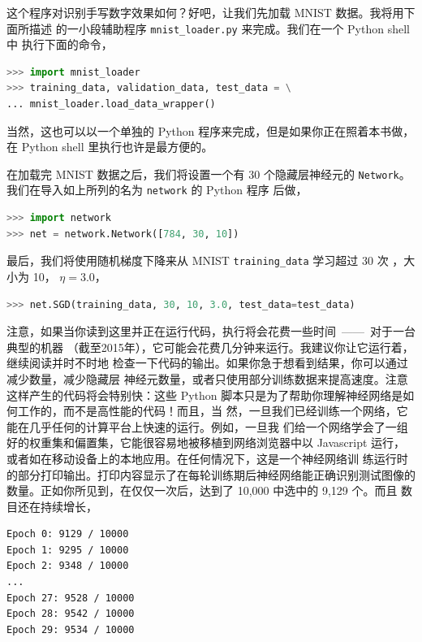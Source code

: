 

这个程序对识别手写数字效果如何？好吧，让我们先加载 MNIST 数据。我将用下面所描述
的一小段辅助程序 \lstinline!mnist_loader.py! 来完成。我们在一个 Python shell 中
执行下面的命令，

\begin{lstlisting}[language=Python]
>>> import mnist_loader
>>> training_data, validation_data, test_data = \
... mnist_loader.load_data_wrapper()
\end{lstlisting}

当然，这也可以以一个单独的 Python 程序来完成，但是如果你正在照着本书做，在
Python shell 里执行也许是最方便的。

在加载完 MNIST 数据之后，我们将设置一个有 30 个隐藏层神经元的
\lstinline!Network!。我们在导入如上所列的名为 \lstinline!network! 的 Python 程序
后做，

\begin{lstlisting}[language=Python]
>>> import network
>>> net = network.Network([784, 30, 10])
\end{lstlisting}

最后，我们将使用随机梯度下降来从 MNIST \lstinline!training_data! 学习超过 30 次%
\epochs{}，\minibatch{}大小为 10，\learningrate{} $\eta = 3.0$，

\begin{lstlisting}[language=Python]
>>> net.SGD(training_data, 30, 10, 3.0, test_data=test_data)
\end{lstlisting}

注意，如果当你读到这里并正在运行代码，执行将会花费一些时间~——~对于一台典型的机器
（截至2015年），它可能会花费几分钟来运行。我建议你让它运行着，继续阅读并时不时地
检查一下代码的输出。如果你急于想看到结果，你可以通过减少\epochs{}数量，减少隐藏层
神经元数量，或者只使用部分训练数据来提高速度。注意这样产生的代码将会特别快：这些
Python 脚本只是为了帮助你理解神经网络是如何工作的，而不是高性能的代码！而且，当
然，一旦我们已经训练一个网络，它能在几乎任何的计算平台上快速的运行。例如，一旦我
们给一个网络学会了一组好的权重集和偏置集，它能很容易地被移植到网络浏览器中以
Javascript 运行，或者如在移动设备上的本地应用。在任何情况下，这是一个神经网络训
练运行时的部分打印输出。打印内容显示了在每轮训练期后神经网络能正确识别测试图像的
数量。正如你所见到，在仅仅一次\epoch{}后，达到了 10,000 中选中的 9,129 个。而且
数目还在持续增长，

\begin{lstlisting}[language=sh]
Epoch 0: 9129 / 10000
Epoch 1: 9295 / 10000
Epoch 2: 9348 / 10000
...
Epoch 27: 9528 / 10000
Epoch 28: 9542 / 10000
Epoch 29: 9534 / 10000
\end{lstlisting}

